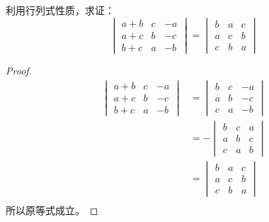 \begin{example}
利用行列式性质，求证：
\[\begin{vmatrix}
    a+b&c&-a\\
    a+c&b&-c\\
    b+c&a&-b
\end{vmatrix}=\begin{vmatrix}
    b&a&c\\
    a&c&b\\
    c&b&a
\end{vmatrix}\]
\end{example}

\begin{proof}
\begin{align*}
    \begin{vmatrix}
        a+b&c&-a\\
        a+c&b&-c\\
        b+c&a&-b
    \end{vmatrix}&=\begin{vmatrix}
        b&c&-a\\
        a&b&-c\\
        c&a&-b
    \end{vmatrix}\tag{定理9}\\
    &=-\begin{vmatrix}
        b&c&a\\
        a&b&c\\
        c&a&b
    \end{vmatrix}\tag{定理5}\\
    &=\begin{vmatrix}
        b&a&c\\
        a&c&b\\
        c&b&a
    \end{vmatrix}\tag{定理2}\\
\end{align*}
    所以原等式成立。
\end{proof}


